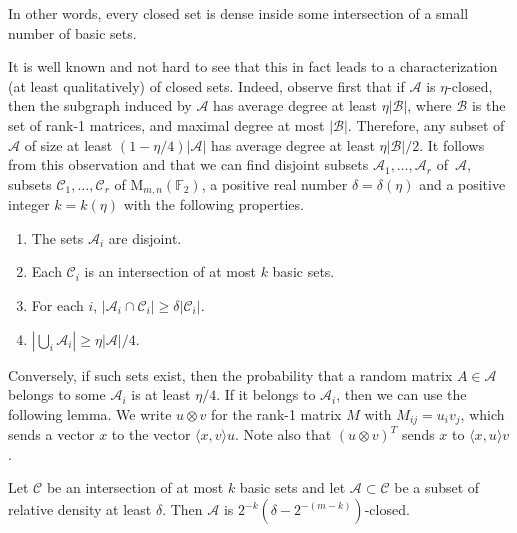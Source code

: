\documentclass{toc}
\newcommand\F{\mathbb{F}}
\renewcommand\d{\delta}
\newcommand \cA{\mathcal A}
\newcommand \cB{\mathcal B}
\newcommand \cC{\mathcal C}
\newcommand \mn{\mathrm{M}_{m,n}(\F_2)}
\begin{document}
\noindent In other words, every closed set is dense inside some intersection of a small number of basic sets.

It is well known and not hard to see that this in fact leads to a characterization (at least qualitatively) of  closed sets. Indeed, observe first that if $\cA$ is  $\eta$-closed, then the subgraph induced by $\cA$ has average degree at least $\eta|\cB|$, where $\cB$ is the set of rank-1 matrices, and maximal degree at most $|\cB|$.
Therefore, any subset of $\cA$ of size at least $(1-\eta/4)|\cA|$ has average degree at least $\eta|\cB|/2$. It follows from this observation and  that we can find disjoint subsets $\cA_1,\dots,\cA_r$ of~$\cA$, subsets $\cC_1,\dots,\cC_r$ of $\mn$, a positive real number $\d=\d(\eta)$ and a positive integer $k=k(\eta)$ with the following properties.
\begin{enumerate}
	\item The sets $\cA_i$ are disjoint.
	\item Each $\cC_i$ is an intersection of at most $k$ basic sets.
	\item For each $i$, $|\cA_i\cap\cC_i|\geq\d|\cC_i|$.
	\item $|\bigcup_i\cA_i|\geq\eta|\cA|/4$.
\end{enumerate}

\noindent %
Conversely, if such sets exist, then the probability that a random matrix $A\in\cA$ belongs to some $\cA_i$ is at least $\eta/4$. If it belongs to $\cA_i$, then we can use the following lemma. We write $u\otimes v$ for the rank-1 matrix $M$ with $M_{ij}=u_iv_j$, which sends a vector $x$ to the vector $\langle x,v\rangle u$. Note also that $(u\otimes v)^T$ sends $x$ to $\langle x,u\rangle v$.

\begin{lemma}
	Let $\cC$ be an intersection of at most $k$ basic sets and let $\cA\subset\cC$ be a subset of relative density at least $\d$. Then $\cA$ is $2^{-k}(\d-2^{-(m-k)})$-closed.
\end{lemma}
\end{document}
